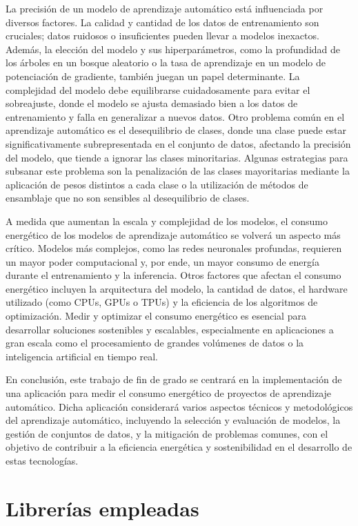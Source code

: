 La precisión de un modelo de aprendizaje automático está influenciada por diversos factores. La calidad y cantidad de los datos de entrenamiento son cruciales; datos ruidosos o insuficientes pueden llevar a modelos inexactos. Además, la elección del modelo y sus hiperparámetros, como la profundidad de los árboles en un bosque aleatorio o la tasa de aprendizaje en un modelo de potenciación de gradiente, también juegan un papel determinante. La complejidad del modelo debe equilibrarse cuidadosamente para evitar el sobreajuste, donde el modelo se ajusta demasiado bien a los datos de entrenamiento y falla en generalizar a nuevos datos.
Otro problema común en el aprendizaje automático es el desequilibrio de clases, donde una clase puede estar significativamente subrepresentada en el conjunto de datos, afectando la precisión del modelo, que tiende a ignorar las clases minoritarias. Algunas estrategias para subsanar este problema son la penalización de las clases mayoritarias mediante la aplicación de pesos distintos a cada clase o la utilización de métodos de ensamblaje que no son sensibles al desequilibrio de clases.

A medida que aumentan la escala y complejidad de los modelos, el consumo energético de los modelos de aprendizaje automático se volverá un aspecto más crítico. Modelos más complejos, como las redes neuronales profundas, requieren un mayor poder computacional y, por ende, un mayor consumo de energía durante el entrenamiento y la inferencia. Otros factores que afectan el consumo energético incluyen la arquitectura del modelo, la cantidad de datos, el hardware utilizado (como CPUs, GPUs o TPUs) y la eficiencia de los algoritmos de optimización. Medir y optimizar el consumo energético es esencial para desarrollar soluciones sostenibles y escalables, especialmente en aplicaciones a gran escala como el procesamiento de grandes volúmenes de datos o la inteligencia artificial en tiempo real.

En conclusión, este trabajo de fin de grado se centrará en la implementación de una aplicación para medir el consumo energético de proyectos de aprendizaje automático. Dicha aplicación considerará varios aspectos técnicos y metodológicos del aprendizaje automático, incluyendo la selección y evaluación de modelos, la gestión de conjuntos de datos, y la mitigación de problemas comunes, con el objetivo de contribuir a la eficiencia energética y sostenibilidad en el desarrollo de estas tecnologías.

\section{Librerías empleadas}

